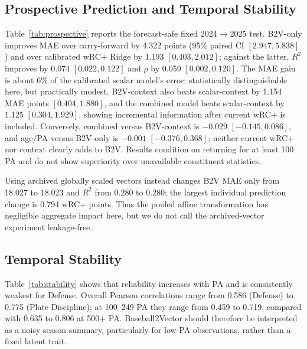 \documentclass[10pt,twocolumn,letterpaper]{article}
\begin{document}
\subsection{Prospective Prediction and Temporal Stability}
\label{sec:prospective-results}
Table~\ref{tab:prospective} reports the forecast-safe fixed 2024$\to$2025 test. B2V-only improves MAE over carry-forward by 4.322 points (95\% paired CI $[2.947,5.838]$) and over calibrated wRC+ Ridge by 1.193 $[0.403,2.012]$; against the latter, $R^2$ improves by 0.074 $[0.022,0.122]$ and $\rho$ by 0.059 $[0.002,0.120]$. The MAE gain is about 6\% of the calibrated scalar model's error: statistically distinguishable here, but practically modest. B2V-context also beats scalar-context by 1.154 MAE points $[0.404,1.880]$, and the combined model beats scalar-context by 1.125 $[0.304,1.929]$, showing incremental information after current wRC+ is included. Conversely, combined versus B2V-context is $-0.029$ $[-0.145,0.086]$, and age/PA versus B2V-only is $-0.001$ $[-0.376,0.368]$; neither current wRC+ nor context clearly adds to B2V. Results condition on returning for at least 100 PA and do not show superiority over unavailable constituent statistics.

\begin{table}[t]
\centering
\caption{Forecast-safe prospective 2025 wRC+ prediction for 358 returning players, trained on 1{,}056 earlier transitions. Brackets are 95\% held-out-player bootstrap intervals. No row is bolded because paired uncertainty, rather than the best point estimate alone, determines comparisons.}
\label{tab:prospective}
\scriptsize

\end{table}

Using archived globally scaled vectors instead changes B2V MAE only from 18.027 to 18.023 and $R^2$ from 0.280 to 0.280; the largest individual prediction change is 0.794 wRC+ points. Thus the pooled affine transformation has negligible aggregate impact here, but we do not call the archived-vector experiment leakage-free.

\subsection{Temporal Stability}
Table~\ref{tab:stability} shows that reliability increases with PA and is consistently weakest for Defense. Overall Pearson correlations range from 0.586 (Defense) to 0.775 (Plate Discipline); at 100--249 PA they range from 0.459 to 0.719, compared with 0.635 to 0.806 at 500+ PA. Baseball2Vector should therefore be interpreted as a noisy season summary, particularly for low-PA observations, rather than a fixed latent trait.
\end{document}
